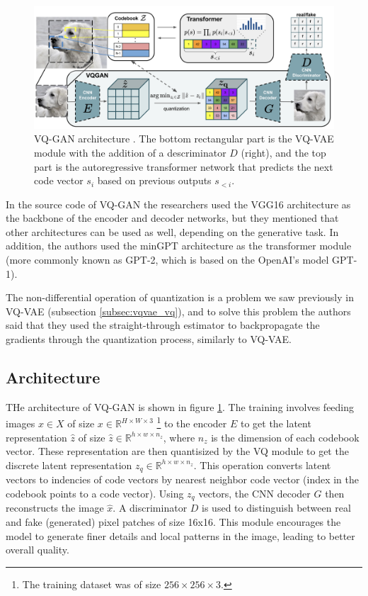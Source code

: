 \begin{figure}
    \centering
    \includegraphics[width=\textwidth]{images/vqgan_architecture.png}
    \caption{VQ-GAN architecture \cite{vqgan}. The bottom rectangular part is the VQ-VAE module with the addition of a descriminator $D$ (right), and the top part is the autoregressive transformer network that predicts the next code vector $s_i$ based on previous outputs $s_{<i}$.}
    \label{fig:vqgan_architecture}
\end{figure}

In the source code of VQ-GAN the researchers used the VGG16 \cite{vgg16} architecture as the backbone of the encoder and decoder networks, but they mentioned that other architectures can be used as well, depending on the generative task. In addition, the authors used the minGPT \cite{mingpt} architecture as the transformer module (more commonly known as GPT-2, which is based on the OpenAI's model GPT-1).

The non-differential operation of quantization is a problem we saw previously in VQ-VAE (subsection \ref{subsec:vqvae_vq}), and to solve this problem the authors said that they used the straight-through estimator \cite{ste} to backpropagate the gradients through the quantization process, similarly to VQ-VAE.






\subsection{Architecture}

THe architecture of VQ-GAN is shown in figure \ref{fig:vqgan_architecture}. The training involves feeding images $x \in X$ of size $x \in \mathbb{R}^{H \times W \times 3}$ \footnote[2]{The training dataset was of size $256 \times 256 \times 3$.} to the encoder $E$ to get the latent representation $\hat{z}$ of size $\hat{z} \in \mathbb{R}^{h \times w \times n_z}$, where $n_z$ is the dimension of each codebook vector. These representation are then quantisized by the VQ module to get the discrete latent representation $z_q \in \mathbb{R}^{h \times w \times n_z}$. This operation converts latent vectors to indencies of code vectors by nearest neighbor code vector (index in the codebook points to a code vector). Using $z_q$ vectors, the CNN decoder $G$ then reconstructs the image $\hat{x}$. A discriminator $D$ is used to distinguish between real and fake (generated) pixel patches of size 16x16. This module encourages the model to generate finer details and local patterns in the image, leading to better overall quality.

